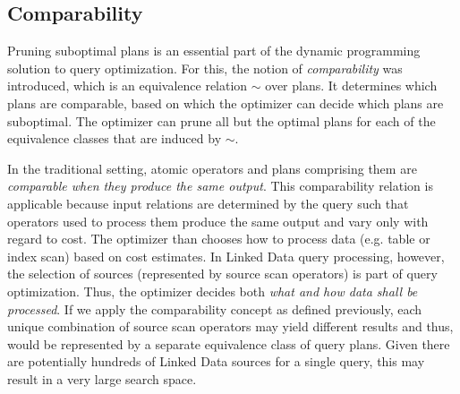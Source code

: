 \subsection{Comparability}
\label{sec:comparability}

Pruning suboptimal plans is an essential part of the dynamic programming solution to
query optimization. 
For this, the notion of \emph{comparability} was introduced, which is an equivalence relation $\sim$ over plans. It determines which plans are comparable, based on which  
the optimizer can decide which plans are suboptimal. The optimizer can prune all but the optimal plans for each of the equivalence classes that are induced by $\sim$. 

In the traditional setting, atomic operators and plans comprising them are \emph{comparable when they produce the same output}. This comparability relation is applicable because input relations are determined by the query such that operators used to process them produce the same output and vary only with regard to cost. The optimizer than chooses how to process data (e.g. table or index
scan) based on cost estimates. In Linked Data query processing, however, the selection of
sources (represented by source scan operators) is part of query
optimization. Thus, the optimizer decides both \emph{what and how data shall be processed}. 
If we apply the comparability concept as defined
previously, each unique combination of source scan operators may yield different results and thus, would be represented by a separate equivalence class of query plans. Given there
are potentially hundreds of Linked Data sources for a single query, this may result in a very large search space. 

